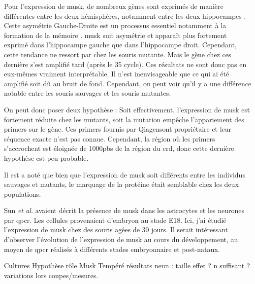 Pour l'expression de \gls{musk}, de nombreux gènes sont exprimés de manière différentes entre les deux hémisphères, notamment entre les deux hippocampes \cite{Moskal2006}. Cette asymétrie Gauche-Droite est un processus essentiel notamment à la formation de la mémoire \cite{Shimbo2018}. \gls{musk} suit asymétrie et apparaît plus fortement exprimé dans l'hippocampe gauche que dans l'hippocampe droit. Cependant, cette tendance ne ressort par chez les souris mutante. Mais le gène chez ces dernière s'est amplifié tard (après le 35 cycle). Ces résultats ne sont donc pas en eux-mêmes vraiment interprétable. Il n'est inenvisageable que ce qui ai été amplifié soit dû au bruit de fond. Cependant, on peut voir qu'il y a une différence notable entre les souris sauvages et les souris mutantes. 

On peut donc poser deux hypothèse : Soit effectivement, l'expression de \gls{musk} est fortement réduite chez les mutants, soit la mutation empêche l'appariement des primers sur le gène. Ces primers fournis par Qiagen\texttrademark sont propriétaire et leur séquence exacte n'est pas connue. Cependant, la région où les primers s'accrochent est éloignée de 1000pbs de la région du \gls{crd}, donc cette dernière hypothèse est peu probable.

Il est a noté que bien que l'expression de \gls{musk} soit différents entre les individus sauvages et mutants, le marquage de la protéine était semblable chez les deux populations. 

Sun \emph{et al.} avaient décrit la présence de \gls{musk} dans les astrocytes et les neurones par \gls{qpcr}. Les cellules provenaient d'embryon au stade E18. Ici, j'ai étudié l'expression de \gls{musk} chez des souris agées de 30 jours. Il serait intéressant d'observer l'évolution de l'expression de \gls{musk} au cours du développement, au moyen de \gls{qpcr} réalisés à différents stades embryonnaire et post-nataux.

Cultures
Hypothèse rôle Musk
Tempéré résultats neun : taille effet ? n suffisant ? variations lors coupes/mesures.